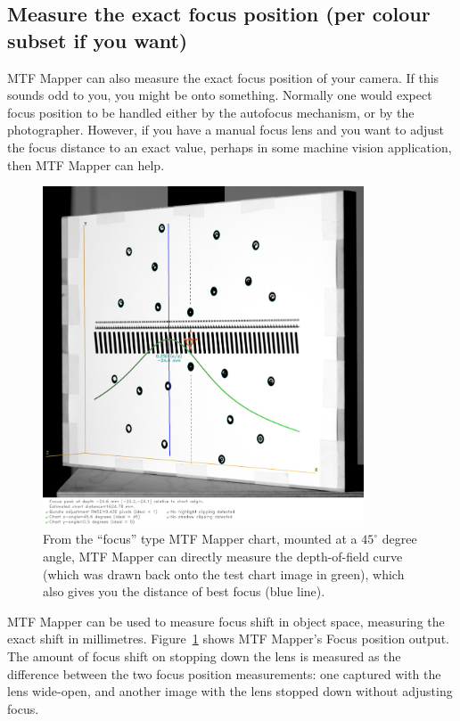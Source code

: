 \documentclass[a4paper]{article}
\begin{document}
\newpage

\subsection{Measure the exact focus position (per colour subset if you want)}
\label{sec:focus_distance}
MTF Mapper can also measure the exact focus position of your camera. If this
sounds odd to you, you might be onto something. Normally one would expect focus
position to be handled either by the autofocus mechanism, or by the
photographer. However, if you have a manual focus lens and you want to
adjust the focus distance to an exact value, perhaps in some machine vision
application, then MTF Mapper can help. 

\begin{figure}[!ht]
\centering
\includegraphics[width=0.85\textwidth]{figures/focus_peak_example}
\caption{From the ``focus'' type MTF Mapper chart, mounted at a $45^\circ$
degree angle, MTF Mapper can directly measure the depth-of-field curve
(which was drawn back onto the test chart image in green),
which also gives you the distance of best focus (blue line).}
\label{fig:focus_example}
\end{figure}

MTF Mapper can be used to measure focus shift in object space, measuring the
exact shift in millimetres. Figure~\ref{fig:focus_example} shows 
MTF Mapper's \textsf{Focus position} output.
The amount of focus shift on stopping down the lens is
measured as the difference between the two focus position measurements: one
captured with the lens wide-open, and another image with the lens stopped down without adjusting
focus.
\end{document}
